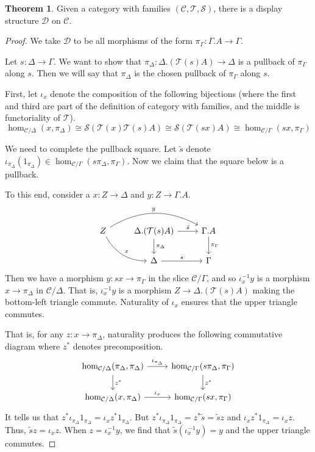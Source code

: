 \documentclass{article}
\theoremstyle{definition}
\newtheorem{theorem}[definition]{Theorem}
\newcommand{\types}{\mathcal T}
\newcommand{\terms}{\mathcal S}
\newcommand{\C}{\mathcal C}
\newcommand{\D}{\mathcal D}
\begin{document}
\begin{theorem}
    Given a category with families $(\C, \types, \terms)$, there is a display structure $\D$ on $\C$.
\end{theorem}
\begin{proof}
    We take $\D$ to be all morphisms of the form $\pi_\Gamma : \Gamma. A \to \Gamma$.

    Let $s : \Delta \to \Gamma$. We want to show that $\pi_\Delta : \Delta. (\types(s) A) \to \Delta$ is a pullback of $\pi_\Gamma$ along $s$. Then we will say that $\pi_\Delta$ is the chosen pullback of $\pi_\Gamma$ along $s$.

    First, let $\iota_x$ denote the composition of the following bijections (where the first and third are part of the definition of category with families, and the middle is functoriality of $\types$).
    \[ \hom_{\C / \Delta}(x,\pi_\Delta)  \cong \terms(\types(x) \types(s) A) \cong  \terms(\types(sx) A) \cong \hom_{\C / \Gamma}(sx, \pi_\Gamma)\]

    We need to complete the pullback square. Let $\tilde s$ denote $\iota_{\pi_\Delta} (1_{\pi_\Delta}) \in \hom_{\C / \Gamma}(s \pi_\Delta, \pi_\Gamma) $. Now we claim that the square below is a pullback.

    To this end, consider a $x : Z \to \Delta$ and $y: Z \to \Gamma.A$.
    \[
         \begin{tikzcd}
            Z \ar[dr,bend right,"x"] \ar[rr,bend left,"y"] & \Delta. (\types(s) A) \ar[r,"\tilde s"] \ar[d,"\pi_\Delta"] & \Gamma.A \ar[d,"\pi_\Gamma"]
             \\ 
             & \Delta \ar[r,"s"] & \Gamma
         \end{tikzcd}
    \]
    Then we have a morphism $y: sx \to \pi_\Gamma$ in the slice $\C / \Gamma$, and so $\iota^{-1}_x y$ is a morphism $x \to \pi_\Delta$ in $\C/\Delta$. That is, $\iota^{-1}_x y$ is a morphism $Z \to \Delta. (\types(s) A)$ making the bottom-left triangle commute. Naturality of $\iota_x$ ensures that the upper triangle commutes. 
    
    That is, for any $z : x \to \pi_\Delta$, naturality produces the following commutative diagram where $z^*$ denotes precomposition.
    \[
         \begin{tikzcd}
            \hom_{\C / \Delta}(\pi_\Delta,\pi_\Delta) \ar[r,"\iota_{\pi_\Delta}"] \ar[d,"z^*"] & \hom_{\C / \Gamma}(s\pi_\Delta, \pi_\Gamma) \ar[d,"z^*"]
             \\ 
             \hom_{\C / \Delta}(x,\pi_\Delta) \ar[r,"\iota_{x}"] & \hom_{\C / \Gamma}(sx, \pi_\Gamma)
         \end{tikzcd}
    \]
    It tells us that $z^* \iota_{\pi_\Delta} 1_{\pi_\Delta}= \iota_x z^* 1_{\pi_\Delta}$. But $z^* \iota_{\pi_\Delta} 1_{\pi_\Delta} = z^* \tilde s = \tilde s z$ and $\iota_x z^* 1_{\pi_\Delta} = \iota_x z$. Thus, $\tilde s z = \iota_x z$. When $z = \iota^{-1}_x y$, we find that $\tilde s (\iota^{-1}_x y) = y$ and the upper triangle commutes.


\end{proof}
\end{document}
